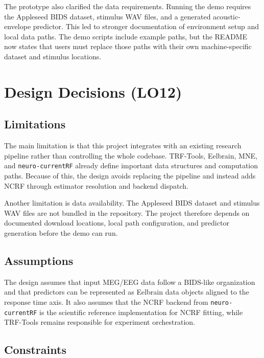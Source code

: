 \documentclass{article}
\begin{document}
The prototype also clarified the data requirements. Running the demo requires the Appleseed BIDS dataset, stimulus WAV files, and a generated acoustic-envelope predictor. This led to stronger documentation of environment setup and local data paths. The demo scripts include example paths, but the README now states that users must replace those paths with their own machine-specific dataset and stimulus locations.

\section{Design Decisions (LO12)}


\subsection*{Limitations}

The main limitation is that this project integrates with an existing research pipeline rather than controlling the whole codebase. TRF-Tools, Eelbrain, MNE, and \texttt{neuro-currentRF} already define important data structures and computation paths. Because of this, the design avoids replacing the pipeline and instead adds NCRF through estimator resolution and backend dispatch.

Another limitation is data availability. The Appleseed BIDS dataset and stimulus WAV files are not bundled in the repository. The project therefore depends on documented download locations, local path configuration, and predictor generation before the demo can run.

\subsection*{Assumptions}

The design assumes that input MEG/EEG data follow a BIDS-like organization and that predictors can be represented as Eelbrain data objects aligned to the response time axis. It also assumes that the NCRF backend from \texttt{neuro-currentRF} is the scientific reference implementation for NCRF fitting, while TRF-Tools remains responsible for experiment orchestration.

\subsection*{Constraints}
\end{document}
